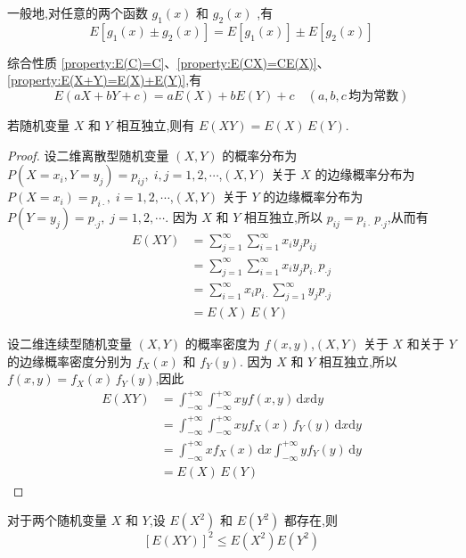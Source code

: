 一般地,对任意的两个函数 $g_1(x)$ 和 $g_2(x)$ ,有
$$
E[g_1(x) \pm g_2(x)] = E[g_1(x)] \pm E[g_2(x)]
$$

综合性质 \ref{property:E(C)=C}、\ref{property:E(CX)=CE(X)}、\ref{property:E(X+Y)=E(X)+E(Y)},有
$$
E(aX+bY+c) = aE(X) + bE(Y) + c \quad (a,b,c \, \text{均为常数})
$$

\begin{property}[][][prop:E(XY)=E(X)E(Y)]
    \indent 若随机变量 $X$ 和 $Y$ 相互独立,则有 $E(XY)=E(X) \, E(Y)$.
\end{property}

\begin{proof}
    设二维离散型随机变量 $(X,Y)$ 的概率分布为 $P(X=x_i,Y=y_j) = p_{ij}, \; i,j=1,2,\cdots$,$(X,Y)$ 关于 $X$ 的边缘概率分布为 $P(X=x_i)=p_{i\cdot}, \; i=1,2,\cdots$,$(X,Y)$ 关于 $Y$ 的边缘概率分布为 $P(Y=y_j)=p_{\cdot j}, \; j=1,2,\cdots$. 因为 $X$ 和 $Y$ 相互独立,所以 $p_{ij} = p_{i\cdot} \, p_{\cdot j}$,从而有
    $$
    \begin{aligned}
        E(XY) &= \sum_{j=1}^{\infty} \sum_{i=1}^{\infty} x_i y_j p_{ij} \\
        &= \sum_{j=1}^{\infty} \sum_{i=1}^{\infty} x_i y_j p_{i\cdot} p_{\cdot j} \\
        &= \sum_{i=1}^{\infty} x_i p_{i\cdot} \sum_{j=1}^{\infty} y_j p_{\cdot j} \\
        &= E(X) \, E(Y)
    \end{aligned}
    $$

    设二维连续型随机变量 $(X,Y)$ 的概率密度为 $f(x,y)$,$(X,Y)$ 关于 $X$ 和关于 $Y$ 的边缘概率密度分别为 $f_X(x)$ 和 $f_Y(y)$. 因为 $X$ 和 $Y$ 相互独立,所以 $f(x,y) = f_X(x) \, f_Y(y)$,因此
    $$
    \begin{aligned}
        E(XY) &= \int_{-\infty}^{+\infty} \int_{-\infty}^{+\infty} xy f(x,y) \, \text{d}x \text{d}y \\
        &= \int_{-\infty}^{+\infty} \int_{-\infty}^{+\infty} xy f_X(x) \, f_Y(y) \, \text{d}x \text{d}y \\
        &= \int_{-\infty}^{+\infty} x f_X(x) \, \text{d}x \int_{-\infty}^{+\infty} y f_Y(y) \, \text{d}y \\
        &= E(X) \, E(Y)
    \end{aligned}
    $$
\end{proof}

\begin{property}[][柯西-施瓦茨不等式]
    \indent 对于两个随机变量 $X$ 和 $Y$,设 $E(X^2)$ 和 $E(Y^2)$ 都存在,则
    $$
    [E(XY)]^2 \leqslant E(X^2) E(Y^2)
    $$
\end{property}

